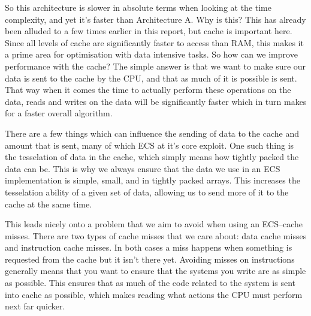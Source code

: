 \documentclass{article}
\begin{document}
So this architecture is slower in absolute terms when looking at the time
complexity, and yet it's faster than Architecture A. Why is this? This has
already been alluded to a few times earlier in this report, but cache is
important here. Since all levels of cache are significantly faster to access
than RAM, this makes it a prime area for optimisation with data intensive tasks.
So how can we improve performance with the cache? The simple answer is that we
want to make sure our data is sent to the cache by the CPU, and that as much of
it is possible is sent. That way when it comes the time to actually perform
these operations on the data, reads and writes on the data will be significantly
faster which in turn makes for a faster overall algorithm.

There are a few things which can influence the sending of data to the cache and
amount that is sent, many of which ECS at it's core exploit. One such thing is
the tesselation of data in the cache, which simply means how tightly packed the
data can be. This is why we always ensure that the data we use in an ECS
implementation is simple, small, and in tightly packed arrays. This increases
the tesselation ability of a given set of data, allowing us to send more of it
to the cache at the same time.

This leads nicely onto a problem that we aim to avoid when using an ECS--cache
misses. There are two types of cache misses that we care about: data cache
misses and instruction cache misses. In both cases a miss happens when something
is requested from the cache but it isn't there yet. Avoiding misses on
instructions generally means that you want to ensure that the systems you write
are as simple as possible. This ensures that as much of the code related to the
system is sent into cache as possible, which makes reading what actions the CPU
must perform next far quicker.
\end{document}
